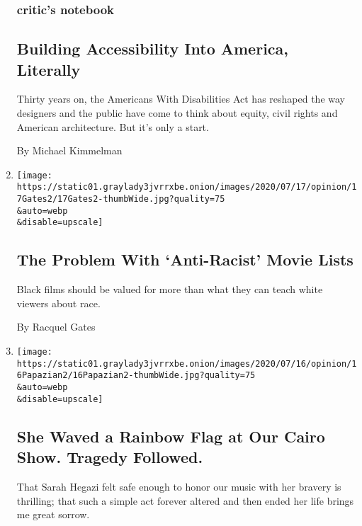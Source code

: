 \begin{enumerate}
{  \subsubsection{critic's notebook}\label{critics-notebook}}

  \hypertarget{building-accessibility-into-america-literally}{%
  \subsection{Building Accessibility Into America,
  Literally}\label{building-accessibility-into-america-literally}}

  Thirty years on, the Americans With Disabilities Act has reshaped the
  way designers and the public have come to think about equity, civil
  rights and American architecture. But it's only a start.

  By Michael Kimmelman
\item
  \href{/2020/07/17/opinion/sunday/black-film-movies-racism.html}{}

  \texttt{[image: https://static01.graylady3jvrrxbe.onion/images/2020/07/17/opinion/17Gates2/17Gates2-thumbWide.jpg?quality=75\\\&auto=webp\\\&disable=upscale]}

  \hypertarget{the-problem-with-anti-racist-movie-lists}{%
  \subsection{The Problem With `Anti-Racist' Movie
  Lists}\label{the-problem-with-anti-racist-movie-lists}}

  Black films should be valued for more than what they can teach white
  viewers about race.

  By Racquel Gates
\item
  \href{/2020/07/16/opinion/culture/mashrou-leila-fan-suicide.html}{}

  \texttt{[image: https://static01.graylady3jvrrxbe.onion/images/2020/07/16/opinion/16Papazian2/16Papazian2-thumbWide.jpg?quality=75\\\&auto=webp\\\&disable=upscale]}

  \hypertarget{she-waved-a-rainbow-flag-at-our-cairo-show-tragedy-followed}{%
  \subsection{She Waved a Rainbow Flag at Our Cairo Show. Tragedy
  Followed.}\label{she-waved-a-rainbow-flag-at-our-cairo-show-tragedy-followed}}

  That Sarah Hegazi felt safe enough to honor our music with her bravery
  is thrilling; that such a simple act forever altered and then ended
  her life brings me great sorrow.


\end{enumerate}
